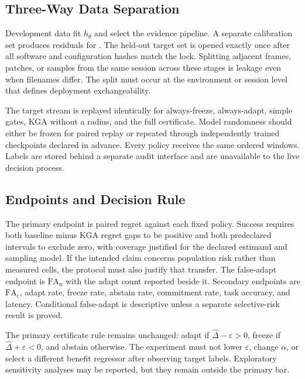 \subsection{Three-Way Data Separation}

Development data fit $h_\theta$ and select the evidence pipeline. A separate calibration set
produces residuals for . The held-out target set is opened exactly once
after all software and configuration hashes match the lock. Splitting adjacent frames, patches, or
samples from the same session across these stages is leakage even when filenames differ. The split
must occur at the environment or session level that defines deployment exchangeability.

The target stream is replayed identically for always-freeze, always-adapt, simple gates, KGA without
a radius, and the full certificate. Model randomness should either be frozen for paired replay or
repeated through independently trained checkpoints declared in advance. Every policy receives the
same ordered windows. Labels are stored behind a separate audit interface and are unavailable to
the live decision process.

\subsection{Endpoints and Decision Rule}

The primary endpoint is paired regret against each fixed policy. Success requires both baseline
minus KGA regret gaps to be positive and both predeclared intervals to exclude zero, with coverage
justified for the declared estimand and sampling model. If the intended claim concerns population
risk rather than measured cells, the protocol must also justify that transfer. The false-adapt
endpoint is $\mathrm{FA}_{\mathrm u}$ with the adapt count
reported beside it. Secondary endpoints are $\mathrm{FA}_{\mathrm c}$, adapt rate, freeze rate,
abstain rate, commitment rate, task accuracy, and latency. Conditional false-adapt is descriptive
unless a separate selective-risk result is proved.

The primary certificate rule remains unchanged: adapt if
$\widehat\Delta-\varepsilon>0$, freeze if
$\widehat\Delta+\varepsilon<0$, and abstain otherwise. The experiment must not lower
$\varepsilon$, change $\alpha$, or select a different benefit regressor after observing target
labels. Exploratory sensitivity analyses may be reported, but they remain outside the primary bar.

